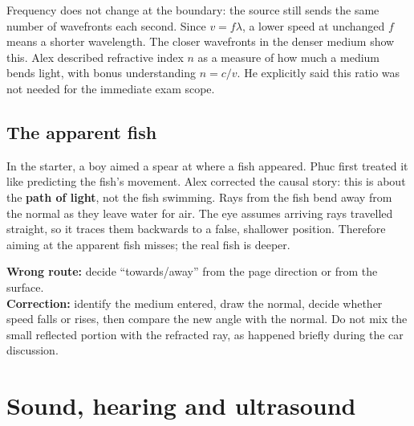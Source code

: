 \documentclass[11pt,a4paper]{article}
\newcommand{\term}[1]{\textbf{#1}}
\begin{document}
\begin{center}
\end{center}

Frequency does not change at the boundary: the source still sends the same number of wavefronts each second. Since $v=f\lambda$, a lower speed at unchanged $f$ means a shorter wavelength. The closer wavefronts in the denser medium show this. Alex described refractive index $n$ as a measure of how much a medium bends light, with bonus understanding $n=c/v$. He explicitly said this ratio was not needed for the immediate exam scope.

\subsection{The apparent fish}
In the starter, a boy aimed a spear at where a fish appeared. Phuc first treated it like predicting the fish's movement. Alex corrected the causal story: this is about the \term{path of light}, not the fish swimming. Rays from the fish bend away from the normal as they leave water for air. The eye assumes arriving rays travelled straight, so it traces them backwards to a false, shallower position. Therefore aiming at the apparent fish misses; the real fish is deeper.

\begin{mistakebox}
\textbf{Wrong route:} decide ``towards/away'' from the page direction or from the surface.\\
\textbf{Correction:} identify the medium entered, draw the normal, decide whether speed falls or rises, then compare the new angle with the normal. Do not mix the small reflected portion with the refracted ray, as happened briefly during the car discussion.
\end{mistakebox}

\section{Sound, hearing and ultrasound}
\end{document}
